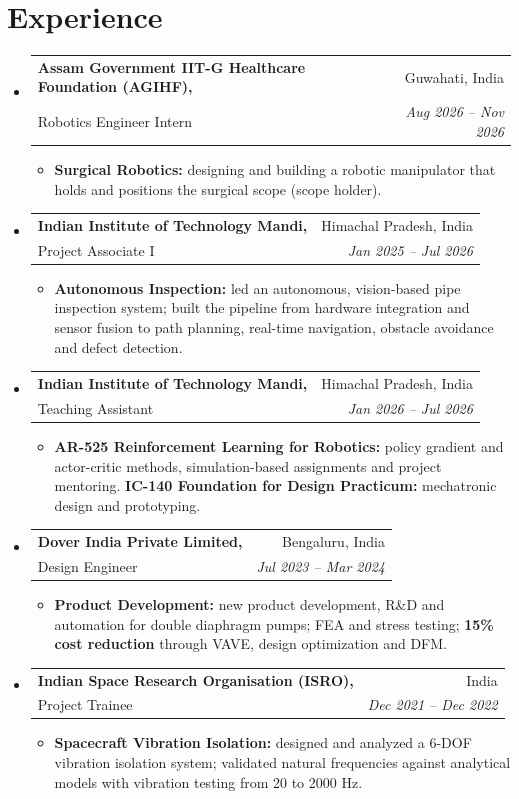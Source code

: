 \documentclass[letterpaper,10pt]{article}
\makeatletter
\newcommand{\entry}[4]{%
  \item[]\begin{tabular*}{\textwidth}{l@{\extracolsep{\fill}}r}
    \textbf{#1} & #2\\
    #3 & \textit{\small #4}\\
  \end{tabular*}\vspace{-3pt}}
\newenvironment{bullets}{\begin{itemize}[label=\textbullet]\small}{\end{itemize}\vspace{-2pt}}
\newenvironment{entries}{\begin{itemize}[leftmargin=0in, label={}, itemsep=6pt]}{\end{itemize}}
\makeatother
\begin{document}
\section{Experience}
\begin{entries}
  \entry{Assam Government IIT-G Healthcare Foundation (AGIHF),}{Guwahati, India}
        {Robotics Engineer Intern}{Aug 2026 -- Nov 2026}
  \begin{bullets}
    \item \textbf{Surgical Robotics:} designing and building a robotic manipulator that holds and positions the surgical scope (scope holder).
  \end{bullets}
  \entry{Indian Institute of Technology Mandi,}{Himachal Pradesh, India}
        {Project Associate I}{Jan 2025 -- Jul 2026}
  \begin{bullets}
    \item \textbf{Autonomous Inspection:} led an autonomous, vision-based pipe inspection system; built the pipeline from hardware integration and sensor fusion to path planning, real-time navigation, obstacle avoidance and defect detection.
  \end{bullets}
  \entry{Indian Institute of Technology Mandi,}{Himachal Pradesh, India}
        {Teaching Assistant}{Jan 2026 -- Jul 2026}
  \begin{bullets}
    \item \textbf{AR-525 Reinforcement Learning for Robotics:} policy gradient and actor-critic methods, simulation-based assignments and project mentoring. \textbf{IC-140 Foundation for Design Practicum:} mechatronic design and prototyping.
  \end{bullets}
  \entry{Dover India Private Limited,}{Bengaluru, India}
        {Design Engineer}{Jul 2023 -- Mar 2024}
  \begin{bullets}
    \item \textbf{Product Development:} new product development, R\&D and automation for double diaphragm pumps; FEA and stress testing; \textbf{15\% cost reduction} through VAVE, design optimization and DFM.
  \end{bullets}
  \entry{Indian Space Research Organisation (ISRO),}{India}
        {Project Trainee}{Dec 2021 -- Dec 2022}
  \begin{bullets}
    \item \textbf{Spacecraft Vibration Isolation:} designed and analyzed a 6-DOF vibration isolation system; validated natural frequencies against analytical models with vibration testing from 20 to 2000 Hz.
  \end{bullets}
\end{entries}
\end{document}
